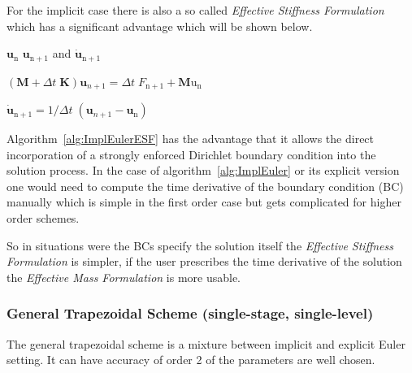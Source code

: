 For the implicit case there is also a so called {\it Effective Stiffness Formulation} which has a
significant advantage which will be shown below.
\begin{algorithm}
\caption{Implicit Euler Time-step Effective Stiffness Formulation} \label{alg:ImplEulerESF}
\begin{algorithmic}
\REQUIRE $\mathbf{u}_{\mathrm{n}}$
\ENSURE $\mathbf{u}_{\mathrm{n}+1}$ and $\mathbf{\dot{u}}_{\mathrm{n}+1}$

\STATE {}
\STATE $\left( \mathbf{M} + \Delta t\; \mathbf{K} \right) \mathbf{u}_{n+1} = \Delta t \; F_{\mathrm{n}+1} + \mathbf{M} \mathrm{u}_{\mathrm{n}}$ 

\STATE {}
\STATE $\mathbf{\dot{u}}_{\mathrm{n}+1} = 1/\Delta t \; \left(\mathbf{u}_{n+1} - \mathbf{u}_{\mathrm{n}}\right)$
\end{algorithmic}
\end{algorithm}
Algorithm~\ref{alg:ImplEulerESF} has the advantage that it allows the direct incorporation of a
strongly enforced Dirichlet boundary condition into the solution process. In the case of
algorithm~\ref{alg:ImplEuler} or its explicit version one would need to compute the time derivative
of the boundary condition (BC) manually which is simple in the first order case but gets complicated for
higher order schemes. 

So in situations were the BCs specify the solution itself the {\it Effective Stiffness Formulation}
is simpler, if the user prescribes the time derivative of the solution the  {\it Effective Mass
Formulation} is more usable.

\subsubsection[Trapezoidal Scheme]{General Trapezoidal Scheme (single-stage, single-level)}
The general trapezoidal scheme is a mixture between implicit and explicit Euler setting. It can have
accuracy of order 2 of the parameters are well chosen.

